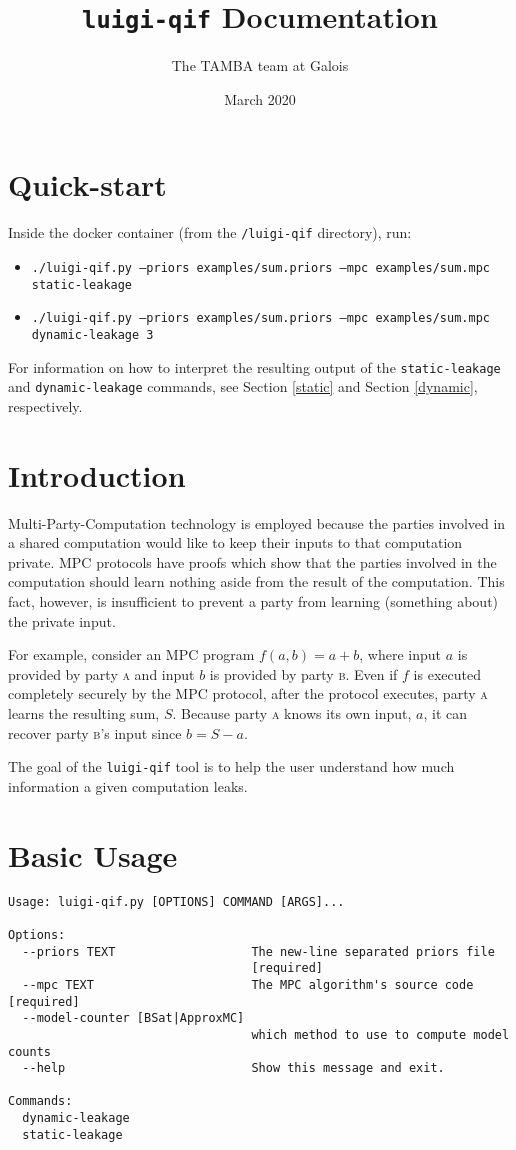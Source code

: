 \documentclass[11pt]{article}
\begin{document}
\title{\texttt{luigi-qif} Documentation}
\author{The TAMBA team at Galois}
\date{March 2020}
\maketitle

\section{Quick-start}
Inside the docker container (from the \texttt{/luigi-qif} directory), run:
{\footnotesize \begin{itemize}
    \item \texttt{./luigi-qif.py --priors examples/sum.priors --mpc examples/sum.mpc static-leakage}
    \item \texttt{./luigi-qif.py --priors examples/sum.priors --mpc examples/sum.mpc dynamic-leakage 3}
\end{itemize}}

For information on how to interpret the resulting output of the \verb`static-leakage` and \verb`dynamic-leakage` commands, see Section \ref{static} and Section \ref{dynamic}, respectively.

\section{Introduction}
Multi-Party-Computation technology is employed because the parties involved in a shared computation would like to keep their inputs to that computation private. MPC protocols have proofs which show that the parties involved in the computation should learn nothing aside from the result of the computation. This fact, however, is insufficient to prevent a party from learning (something about) the private input.

For example, consider an MPC program $f(a, b) = a + b$, where input $a$ is provided by party \textsc{a} and input $b$ is provided by party \textsc{b}. Even if $f$ is executed completely securely by the MPC protocol, after the protocol executes, party \textsc{a} learns the resulting sum, $S$. Because party \textsc{a} knows its own input, $a$, it can recover party \textsc{b}'s input since $b = S - a$.

The goal of the \texttt{luigi-qif} tool is to help the user understand how much information a given computation leaks.

\section{Basic Usage}
\begin{verbatim}
Usage: luigi-qif.py [OPTIONS] COMMAND [ARGS]...

Options:
  --priors TEXT                   The new-line separated priors file
                                  [required]
  --mpc TEXT                      The MPC algorithm's source code  [required]
  --model-counter [BSat|ApproxMC]
                                  which method to use to compute model counts
  --help                          Show this message and exit.

Commands:
  dynamic-leakage
  static-leakage
\end{verbatim}
\end{document}
